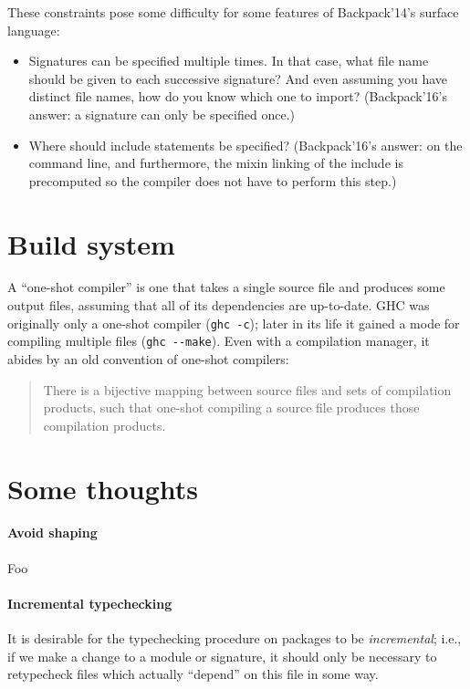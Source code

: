 \noindent
These constraints pose some difficulty for some features of
Backpack'14's surface language:

\begin{itemize}
    \item Signatures can be specified multiple times.  In that
    case, what file name should be given to each successive
    signature?  And even assuming you have distinct file names,
    how do you know which one to import? (Backpack'16's answer: a
    signature can only be specified once.)
    \item Where should include statements be specified?
    (Backpack'16's answer: on the command line, and furthermore,
    the mixin linking of the include is precomputed so the
    compiler does not have to perform this step.)
\end{itemize}

\section{Build system}

A ``one-shot compiler'' is one that takes a single source file and
produces some output files, assuming that all of its dependencies are
up-to-date.  GHC was originally only a one-shot compiler (\verb|ghc -c|);
later in its life it gained a mode for compiling multiple files
(\verb|ghc --make|).  Even with a compilation manager, it abides by
an old convention of one-shot compilers:

\begin{quote}
There is a bijective mapping between source files and sets of
compilation products, such that one-shot compiling a source file
produces those compilation products.
\end{quote}

\section{Some thoughts}

\paragraph{Avoid shaping}
Foo

\paragraph{Incremental typechecking}
It is desirable for the typechecking procedure on packages to
be \emph{incremental}; i.e., if we make a change to a module
or signature, it should only be necessary to retypecheck
files which actually ``depend'' on this file in some way.



